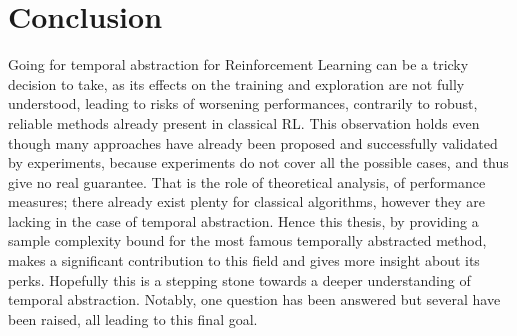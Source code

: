 \chapter{Conclusion}
\label{Chapter5}

Going for temporal abstraction for Reinforcement Learning can be a tricky decision to take, as its effects on the training and exploration are not fully understood, leading to risks of worsening performances, contrarily to robust, reliable methods already present in classical RL. This observation holds even though many approaches have already been proposed and successfully validated by experiments, because experiments do not cover all the possible cases, and thus give no real guarantee. That is the role of theoretical analysis, of performance measures; there already exist plenty for classical algorithms, however they are lacking in the case of temporal abstraction. Hence this thesis, by providing a sample complexity bound for the most famous temporally abstracted method, makes a significant contribution to this field and gives more insight about its perks. Hopefully this is a stepping stone towards a deeper understanding of temporal abstraction. Notably, one question has been answered but several have been raised, all leading to this final goal.
